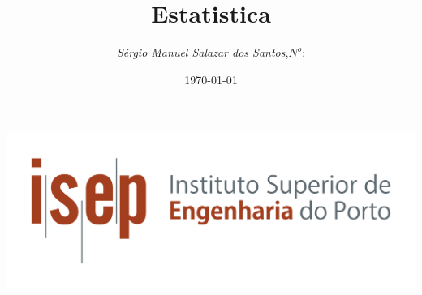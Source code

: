 \begin{titlepage}
\begin{minipage}{0.95\linewidth}
\centering
\includegraphics[scale=0.60]{./Image/Capa/ISEP_marca_cor_grande.png}
\label{Capa}
\title{Estatistica}
\author{\emph{S\'{e}rgio Manuel Salazar dos Santos},\;$N^o$:}
\date{\today}
\maketitle
\end{minipage}
\end{titlepage}